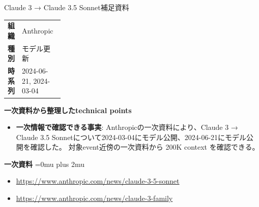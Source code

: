 \begin{technicalnote}{Claude 3 → Claude 3.5 Sonnet}{補足資料}
\begingroup
\begin{tabularx}{\linewidth}{@{}>{\bfseries}p{0.22\linewidth}X@{}}
組織 & Anthropic \\
種別 & モデル更新 \\
時系列 & 2024-06-21, 2024-03-04 \\
\end{tabularx}
\smallskip
\begin{minipage}{\linewidth}
{\bfseries 一次資料から整理したtechnical points}
\begin{itemize}[leftmargin=1.5em,itemsep=0.35em]
\item \textbf{一次情報で確認できる事実}: Anthropicの一次資料により、Claude 3 → Claude 3.5 Sonnetについて2024-03-04にモデル公開、2024-06-21にモデル公開を確認した。 対象event近傍の一次資料から 200K context を確認できる。
\end{itemize}
\begin{minipage}{\linewidth}
\begin{samepage}
{\bfseries 一次資料}
\begingroup\sloppy
\Urlmuskip=0mu plus 2mu\relax
\begin{itemize}[leftmargin=1.5em,itemsep=0.25em]
\item {\scriptsize\url{https://www.anthropic.com/news/claude-3-5-sonnet}}
\item {\scriptsize\url{https://www.anthropic.com/news/claude-3-family}}
\end{itemize}
\endgroup
\end{samepage}
\end{minipage}
\end{minipage}
\endgroup
\end{technicalnote}
\medskip

